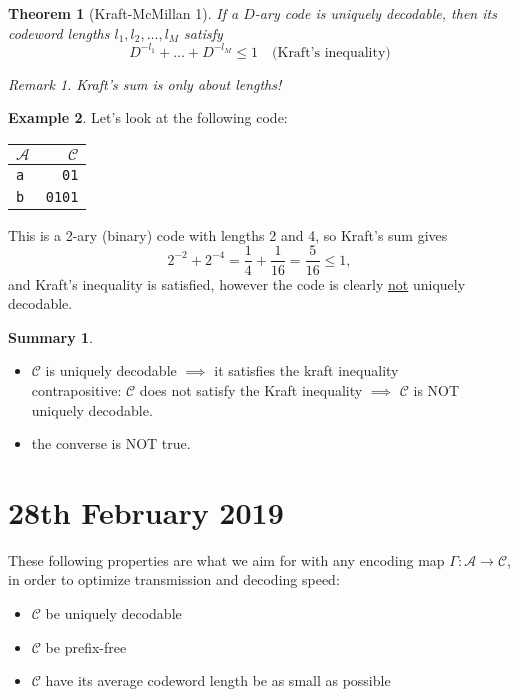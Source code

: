 \documentclass{report}
\theoremstyle{plain}
\newtheorem{thm}{Theorem}
\theoremstyle{definition}
\newtheorem{exmp}[thm]{Example}
\newtheorem*{summary}{Summary}
\theoremstyle{remark}
\newtheorem*{remark}{Remark}
\begin{document}
\begin{thm}[Kraft-McMillan 1]
	If a $D$-ary code is uniquely decodable, then its codeword lengths $l_1, l_2, \ldots, l_M$ satisfy
\begin{equation}
	D^{-l_1} + \dots + D^{-l_M} \leq 1 \quad \text{(Kraft's inequality)}
\end{equation}
\begin{remark}
Kraft's sum is only about lengths!
\end{remark}
\end{thm}

\begin{exmp} Let's look at the following code:
\begin{center}
	\begin{tabular}{l | r}
	$\mathcal A$ & $\mathcal C$ \\ \hline
	\texttt a & \texttt{01} \\
	\texttt b & \texttt{0101}	
	\end{tabular}
\end{center}
	This is a 2-ary (binary) code with lengths 2 and 4, so Kraft's sum gives
	\begin{equation*}
		2^{-2} + 2^{-4} = \frac14 + \frac{1}{16} = \frac{5}{16} \leq 1,
	\end{equation*}
	and Kraft's inequality is satisfied, however the code is clearly \ul{not} uniquely decodable.
\end{exmp}


\begin{summary}
\begin{itemize}
	\item $\mathcal C$ is uniquely decodable $\implies$ it satisfies the kraft inequality \\
			contrapositive: $\mathcal C$ does not satisfy the Kraft inequality $\implies$ $\mathcal C$ is NOT uniquely decodable.
	\item the converse is NOT true.
\end{itemize}
\end{summary}

\section{28th February 2019}

These following properties are what we aim for with any encoding map $\Gamma : \mathcal A \to \mathcal C$, in order to optimize transmission and decoding speed:
\begin{itemize}
	\item $\mathcal C$ be uniquely decodable
	\item $\mathcal C$ be prefix-free
	\item $\mathcal C$ have its average codeword length be as small as possible
\end{itemize}
\end{document}
